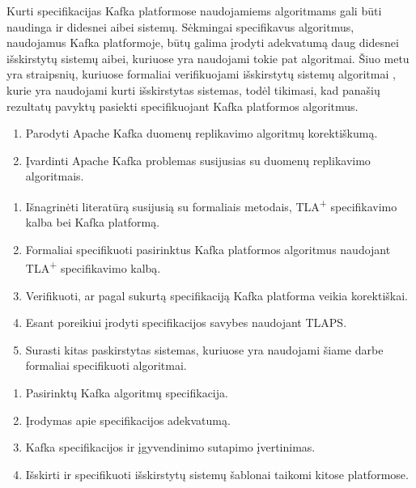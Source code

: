 \documentclass{VUMIFPSmagistrinis}
\begin{document}
		
		Kurti specifikacijas Kafka platformose naudojamiems algoritmams gali būti naudinga ir didesnei aibei sistemų. 
		Sėkmingai specifikavus algoritmus, naudojamus Kafka platformoje, būtų galima įrodyti adekvatumą daug didesnei išskirstytų sistemų aibei, kuriuose yra naudojami tokie pat algoritmai. 
		Šiuo metu yra straipsnių, kuriuose formaliai verifikuojami išskirstytų sistemų algoritmai \cite{lamport2005generalized}, kurie yra naudojami kurti išskirstytas sistemas, todėl tikimasi, kad panašių rezultatų pavyktų pasiekti specifikuojant Kafka platformos algoritmus.
	
		\begin{enumerate}
			\item{Parodyti Apache Kafka duomenų replikavimo algoritmų korektiškumą.}
			\item{Įvardinti Apache Kafka problemas susijusias su duomenų replikavimo algoritmais.}
		\end{enumerate}	

	
		\begin{enumerate}
			\item{Išnagrinėti literatūrą susijusią su formaliais metodais, TLA\textsuperscript{+} specifikavimo kalba bei Kafka platformą.}
			\item{Formaliai specifikuoti pasirinktus Kafka platformos algoritmus naudojant TLA\textsuperscript{+} specifikavimo kalbą.}
			\item{Verifikuoti, ar pagal sukurtą specifikaciją Kafka platforma veikia korektiškai.}
			\item{Esant poreikiui įrodyti specifikacijos savybes naudojant TLAPS.}
			\item{Surasti kitas paskirstytas sistemas, kuriuose yra naudojami šiame darbe formaliai specifikuoti algoritmai.}
		\end{enumerate}
	
		\begin{enumerate}
			\item{Pasirinktų Kafka algoritmų specifikacija.}
			\item{Įrodymas apie specifikacijos adekvatumą.}
			\item{Kafka
 specifikacijos ir įgyvendinimo sutapimo įvertinimas.}
			\item{Išskirti ir specifikuoti išskirstytų sistemų šablonai taikomi kitose platformose.}
		\end{enumerate}
	\pagebreak
	\printbibliography[heading=bibintoc] 
\end{document}
